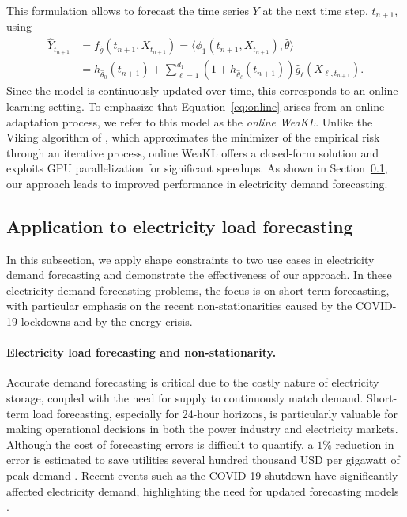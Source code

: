 This formulation allows to forecast the time series $Y$ at the next time step, $t_{n+1}$, using
\begin{align*}
\hat Y_{t_{n+1}} &= f_{\hat \theta}(t_{n+1}, X_{t_{n+1}}) = \langle \phi_1(t_{n+1}, X_{t_{n+1}}), \hat \theta\rangle \\
&=   h_{\hat \theta_0}(t_{n+1}) + \sum_{\ell=1}^{d_1} (1+h_{\hat \theta_\ell}(t_{n+1})) \hat g_\ell(X_{\ell,t_{n+1}}).
\end{align*}
Since the model is continuously updated over time, this corresponds to an online learning setting.
To emphasize that Equation~\eqref{eq:online} arises from an online adaptation process, we refer to this model as the \textit{online WeaKL}.
Unlike the Viking algorithm of \citet{vilmarest2024viking}, which approximates the minimizer of the empirical risk through an iterative process, online WeaKL offers a closed-form solution and exploits GPU parallelization for significant speedups.
As shown in Section~\ref{sec:energy_crisis}, our approach leads to improved performance in electricity demand forecasting. 



\subsection{Application to electricity load forecasting}
\label{sec:energy_crisis}
In this subsection, we apply shape constraints to two use cases in electricity demand forecasting and demonstrate the effectiveness of our approach.
In these electricity demand forecasting problems, the focus is on short-term forecasting, with particular emphasis on the recent non-stationarities caused by the COVID-19 lockdowns and by the energy crisis.

\paragraph{Electricity load forecasting and non-stationarity.} Accurate demand forecasting is critical due to the costly nature of electricity storage, coupled with the need for supply to continuously match demand.  
Short-term load forecasting, especially for 24-hour horizons, is particularly valuable for making operational decisions in both the power industry and electricity markets.
Although the cost of forecasting errors is difficult to quantify, a $1\%$ reduction in error is estimated to save utilities several hundred thousand USD per gigawatt of peak demand \citep{hong2016probabilistic}. 
Recent events such as the COVID-19 shutdown have significantly affected electricity demand, highlighting the need for updated forecasting models  \citep{zarbakhsh2022human}.


